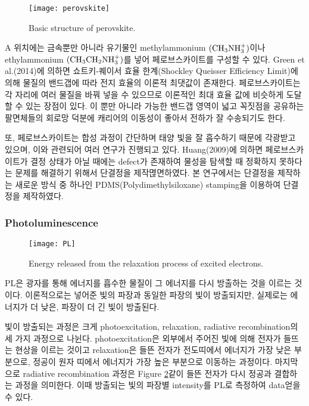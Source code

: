 \begin{figure}[H]
	\begin{center}
			\texttt{[image: perovskite]}
	\end{center}
	\caption{Basic structure of perovskite.}
	\label{fig:perov} 
\end{figure}

A 위치에는 금속뿐만 아니라 유기물인  methylammonium $\rm(CH_3NH_3^+)$이나 ethylammonium $\rm(CH_3CH_2NH_3^+)$를 넣어 페로브스카이트를 구성할 수 있다. Green et al.(2014)에 의하면 쇼트키-퀘이서 효율 한계(Shockley Queisser Efficiency Limit)에 의해 물질의 밴드갭에 따라 전지 효율의 이론적 최댓값이 존재한다\cite{green2014emergence}. 페로브스카이트는 각 자리에 여러 물질을 바꿔 넣을 수 있으므로 이론적인 최대 효율 값에 비슷하게 도달할 수 있는 장점이 있다. 이 뿐만 아니라 가능한 밴드갭 영역이 넓고 꼭짓점을 공유하는 팔면체들의 회로망 덕분에 캐리어의 이동성이 좋아서 전하가 잘 수송되기도 한다\cite{green2014emergence}.

또, 페로브스카이트는 합성 과정이 간단하며 태양 빛을 잘 흡수하기 때문에 각광받고 있으며, 이와 관련되어 여러 연구가 진행되고 있다. Huang(2009)에 의하면 페로브스카이트가 결정 상태가 아닐 때에는 defect가 존재하여 물성을 탐색할 때 정확하지 못하다는 문제를 해결하기 위해서 단결정을 제작멶면하였다\cite{huang2009fabrication}. 본 연구에서는 단결정을 제작하는 새로운 방식 중 하나인 PDMS(Polydimethylsiloxane) stamping을 이용하여 단결정을 제작하였다.
\\

\subsubsection{Photoluminescence}

\begin{figure}[H]
	\begin{center}
			\texttt{[image: PL]}
	\end{center}
	\caption{Energy released from the relaxation process of excited electrons.}
	\label{fig:pl} 
\end{figure}

PL은 광자를 통해 에너지를 흡수한 물질이 그 에너지를 다시 방출하는 것을 이르는 것이다. 이론적으로는 넣어준 빛의 파장과 동일한 파장의 빛이 방출되지만, 실제로는 에너지가 더 낮은, 파장이 더 긴 빛이 방출된다. 

빛이 방출되는 과정은 크게 photoexcitation, relaxation, radiative recombination의 세 가지 과정으로 나뉜다. photoexcitation은 외부에서 주어진 빛에 의해 전자가 들뜨는 현상을 이르는 것이고 relaxation은 들뜬 전자가 전도띠에서 에너지가 가장 낮은 부분으로, 정공이 원자 띠에서 에너지가 가장 높은 부분으로 이동하는 과정이다. 마지막으로 radiative recombination 과정은 Figure \ref{fig:pl}\과 같이 들뜬 전자가 다시 정공과 결합하는 과정을 의미한다. 이때 방출되는 빛의 파장별 intensity를 PL로 측정하여 data\를 얻을 수 있다.
\\

